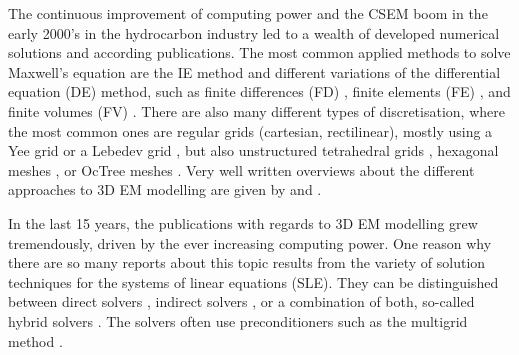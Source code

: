 \documentclass[
    paper,
  ]{geophysics}
\begin{document}
The continuous improvement of computing power and the CSEM boom in the early
2000's in the hydrocarbon industry led to a wealth of developed numerical
solutions and according publications. The most common applied methods to solve
Maxwell's equation are the IE method \citep{GJI.74.Raiche, RS.02.Hursan,
GEO.06.Zhdanov, GP.10.Tehrani, CAG.16.Kruglyakov, MGS.17.Kruglyakov} and
different variations of the differential equation (DE) method, such as finite
differences (FD) \citep{IEEE.66.Yee, GEO.93.Wang, RSC.94.Mackie, RS.94.Druskin,
GEO.09.Streich, CAG.13.Sommer}, finite elements (FE) \citep{GEO.04.Commer,
GJI.11.Schwarzbach,GEO.12.daSilva, GJI.13.Grayver, GJI.13.Puzyrev,
SEG.16.Zhang}, and finite volumes (FV) \citep{EM.90.Madsen, Haber2001,PIER.01.Clemens,
GP.06.Mulder, ECP.07.Haber, GEO.14.Jahandari}. There are also many different
types of discretisation, where the most common ones are regular grids
(cartesian, rectilinear), mostly using a Yee grid \citep{IEEE.66.Yee} or a
Lebedev grid \citep{CMMP.64.Lebedev}, but also unstructured tetrahedral grids
\citep{SEG.16.Zhang, CAG.17.Cai}, hexagonal meshes \citep{CAG.14.Cai}, or
OcTree meshes \citep{ECP.07.Haber}. Very well written overviews about the
different approaches to 3D EM modelling are given by \cite{SG.05.Avdeev} and
\cite{SG.10.Borner}.

In the last 15 years, the publications with regards to 3D EM modelling grew
tremendously, driven by the ever increasing computing power. One reason why
there are so many reports about this topic results from the variety of solution
techniques for the systems of linear equations (SLE). They can be distinguished
between direct solvers \citep{GEO.09.Streich, GP.14.Chung, GEO.14.Jaysaval,
GEO.15.Grayver, SEG.15.Oh, GJI.18.Wang}, indirect solvers \citep{GP.06.Mulder,
GJI.15.Jaysaval}, or a combination of both, so-called hybrid solvers
\citep{GEO.18.Liu}. The solvers often use preconditioners such as the multigrid
method \citep{SIAM.02.Aruliah, GP.06.Mulder, GJI.16.Jaysaval}.
\end{document}
